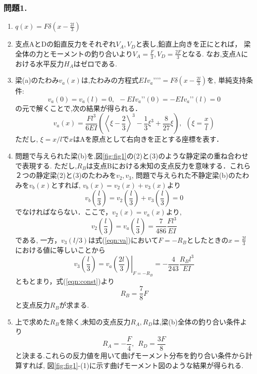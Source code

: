 ﻿\documentclass[10pt,a4j]{jarticle}
\begin{document}
\subsubsection*{問題1.}
\begin{enumerate}
\item
	$q(x)=F\delta\left(x-\frac{2l}{3}\right)$
\item
支点AとDの鉛直反力をそれぞれ$V_A,V_D$と表し,鉛直上向きを正にとれば，
梁全体の力とモーメントの釣り合いより$V_A=\frac{F}{3}, V_D=\frac{2F}{3}$となる.
なお,支点Aにおける水平反力$H_A$はゼロである.
\item
	梁(a)のたわみ$v_a(x)$は,たわみの方程式$EIv_a’’’’=F\delta\left(x-\frac{2l}{3}\right)$を,
単純支持条件:
\[
	v_a(0)=v_a(l)=0, \ \ -EIv_a’’(0)=-EIv_a’’(l)=0
\]
の元で解くことで,次の結果が得られる．
\begin{equation}
	v_a(x)=\frac{Fl^3}{6EI}\left( \left<\xi -\frac{2}{3}\right>^3-\frac{1}{3}\xi^3+\frac{8}{27}\xi \right), 
	\ \ \left(\xi=\frac{x}{l}\right)
	\label{eqn:va}
\end{equation}
ただし, $\xi=x/l$で$x$はAを原点として右向きを正とする座標を表す．
\item
問題で与えられた梁(b)を,図\ref{fig:fig1}の(2)と(3)のような静定梁の重ね合わせで表現する.
ただし,$R_B$は支点Bにおける未知の支点反力を意味する．これら２つの静定梁(2)と(3)のたわみを$v_2,v_3$, 
問題で与えられた不静定梁(b)のたわみを$v_b(x)$とすれば,
$v_b(x)=v_2(x)+v_3(x)$より
\begin{equation}
	v_b\left(\frac{l}{3}\right)=v_2\left(\frac{l}{3}\right)+v_3\left(\frac{l}{3}\right)=0
	\label{eqn:const}
\end{equation}
でなければならない．ここで，$v_2(x)=v_a(x)$より, 
\begin{equation}
	v_2\left(\frac{l}{3}\right)=
	v_a\left(\frac{l}{3}\right)=\frac{7}{486}\frac{Fl^3}{EI}
	\label{eqn:}
\end{equation}
である, 一方，$v_3(l/3)$は式(\ref{eqn:va})において$F=-R_B$としたときの$x=\frac{2l}{3}$
における値に等しいことから
\begin{equation}
	v_3\left(\frac{l}{3}\right)=\left. v_a\left(\frac{2l}{3} \right)\right|_{F=-R_B}
	=
	-\frac{4}{243}\frac{R_Bl^3}{EI}
\end{equation}
ともとまり，式(\ref{eqn:const})より
\begin{equation}
	R_B=\frac{7}{8}F
	\label{eqn:}
\end{equation}
と支点反力$R_B$が求まる.
\item
上で求めた$R_B$を除く,未知の支点反力$R_A,R_D$は,梁(b)全体の釣り合い条件より
\begin{equation}
	R_A=-\frac{F}{4}, \ \ 
	R_D= \frac{3F}{8}
	\label{eqn:}
\end{equation}
と決まる.これらの反力値を用いて曲げモーメント分布を釣り合い条件から計算すれば,
図\ref{fig:fig1}-(1)に示す曲げモーメント図のような結果が得られる.
\end{enumerate}
\end{document}

